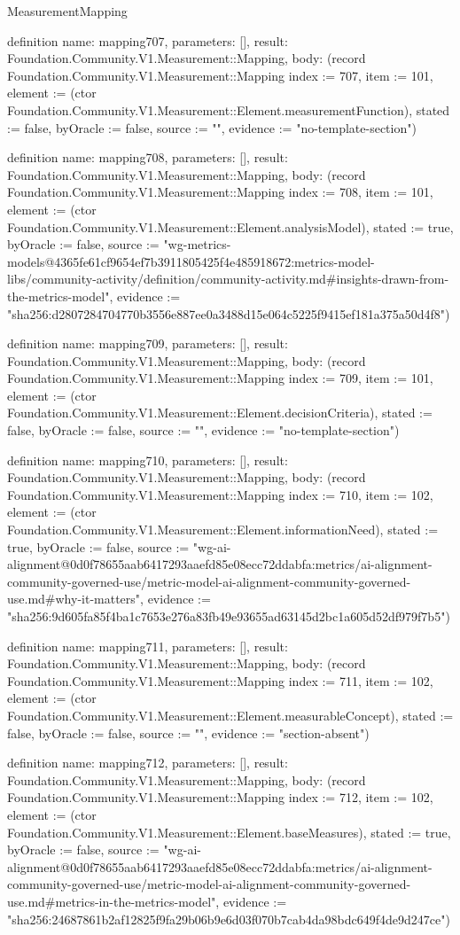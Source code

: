 \begin{lexlean}{MeasurementMapping}
\begin{semanticmodule}
definition{
  name: mapping707,
  parameters: [],
  result: Foundation.Community.V1.Measurement::Mapping,
  body: (record Foundation.Community.V1.Measurement::Mapping {index := 707, item := 101, element := (ctor Foundation.Community.V1.Measurement::Element.measurementFunction), stated := false, byOracle := false, source := "", evidence := "no-template-section"})
}

definition{
  name: mapping708,
  parameters: [],
  result: Foundation.Community.V1.Measurement::Mapping,
  body: (record Foundation.Community.V1.Measurement::Mapping {index := 708, item := 101, element := (ctor Foundation.Community.V1.Measurement::Element.analysisModel), stated := true, byOracle := false, source := "wg-metrics-models@4365fe61cf9654ef7b3911805425f4e485918672:metrics-model-libs/community-activity/definition/community-activity.md#insights-drawn-from-the-metrics-model", evidence := "sha256:d2807284704770b3556e887ee0a3488d15e064c5225f9415ef181a375a50d4f8"})
}

definition{
  name: mapping709,
  parameters: [],
  result: Foundation.Community.V1.Measurement::Mapping,
  body: (record Foundation.Community.V1.Measurement::Mapping {index := 709, item := 101, element := (ctor Foundation.Community.V1.Measurement::Element.decisionCriteria), stated := false, byOracle := false, source := "", evidence := "no-template-section"})
}

definition{
  name: mapping710,
  parameters: [],
  result: Foundation.Community.V1.Measurement::Mapping,
  body: (record Foundation.Community.V1.Measurement::Mapping {index := 710, item := 102, element := (ctor Foundation.Community.V1.Measurement::Element.informationNeed), stated := true, byOracle := false, source := "wg-ai-alignment@0d0f78655aab6417293aaefd85e08ecc72ddabfa:metrics/ai-alignment-community-governed-use/metric-model-ai-alignment-community-governed-use.md#why-it-matters", evidence := "sha256:9d605fa85f4ba1c7653e276a83fb49e93655ad63145d2bc1a605d52df979f7b5"})
}

definition{
  name: mapping711,
  parameters: [],
  result: Foundation.Community.V1.Measurement::Mapping,
  body: (record Foundation.Community.V1.Measurement::Mapping {index := 711, item := 102, element := (ctor Foundation.Community.V1.Measurement::Element.measurableConcept), stated := false, byOracle := false, source := "", evidence := "section-absent"})
}

definition{
  name: mapping712,
  parameters: [],
  result: Foundation.Community.V1.Measurement::Mapping,
  body: (record Foundation.Community.V1.Measurement::Mapping {index := 712, item := 102, element := (ctor Foundation.Community.V1.Measurement::Element.baseMeasures), stated := true, byOracle := false, source := "wg-ai-alignment@0d0f78655aab6417293aaefd85e08ecc72ddabfa:metrics/ai-alignment-community-governed-use/metric-model-ai-alignment-community-governed-use.md#metrics-in-the-metrics-model", evidence := "sha256:24687861b2af12825f9fa29b06b9e6d03f070b7cab4da98bdc649f4de9d247ce"})
}


\end{semanticmodule}
\end{lexlean}
